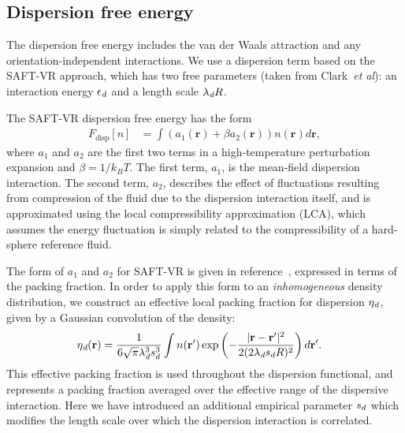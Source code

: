 \documentclass[twocolumn,amsmath,amssymb,prb]{revtex4-1}
\newcommand{\xx}{\textbf{r}}
\begin{document}
\subsection{Dispersion free energy}
The dispersion free energy includes the van der Waals attraction and
any orientation-independent interactions. We use a dispersion term
based on the SAFT-VR approach\cite{gil-villegas-1997-SAFT-VR}, which
has two free parameters (taken from Clark~\emph{et
  al}\cite{clark2006developing}): an interaction energy $\epsilon_\textit{d}$
and a length scale $\lambda_\textit{d} R$.

The SAFT-VR dispersion free energy has the form~\cite{gil-villegas-1997-SAFT-VR}
\begin{align}
  F_\text{disp}[n] &= \int \left(a_1(\xx) + \beta a_2(\xx)\right)n(\xx)d\xx,
\end{align}
where $a_1$ and $a_2$ are the first two terms in a high-temperature
perturbation expansion and $\beta=1/k_BT$.  The first term, $a_1$, is 
the mean-field dispersion interaction. The second term, $a_2$, describes the
effect of fluctuations resulting from compression of the fluid due
to the dispersion interaction itself, and is approximated
using the local compressibility approximation (LCA), which
assumes the energy fluctuation is simply related to the
compressibility of a hard-sphere reference fluid\cite{barker1976liquid}.

The form of $a_1$ and $a_2$ for SAFT-VR is given in
reference~\cite{gil-villegas-1997-SAFT-VR}, expressed in terms
of the packing fraction.  In order to apply this form to an
\emph{inhomogeneous} density distribution, we construct an effective local
packing fraction for dispersion $\eta_\textit{d}$, given by a Gaussian
convolution of the density:
\begin{align}
  \etadisp(\xx) &= \frac{1}{6\sqrt{\pi} \lambdadisp^3\lscale^3}
  \int n(\xx')\exp\left({-\frac{|\xx-\xx'|^2}{2(2 \lambdadisp
      \lscale R)^2}}\right)d\xx'.
\end{align}
This effective packing fraction is used throughout the dispersion
functional, and represents a packing fraction averaged over the
effective range of the dispersive interaction.  Here we have
introduced an additional empirical parameter $s_d$ which modifies
the length scale over which the dispersion interaction is correlated.
\end{document}
